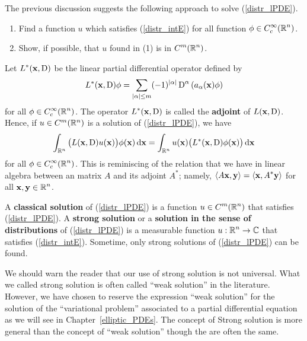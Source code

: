 The previous discussion suggests the following approach to solve
(\ref{distr_lPDE}).
\begin{enumerate}
\item Find a function $u$ which satisfies (\ref{distr_intE}) for all
function $\displaystyle \phi \in C_c^\infty(\mathbb{R}^n)$.
\item Show, if possible, that $u$ found in (1) is in
$\displaystyle C^m(\mathbb{R}^n)$.
\end{enumerate}

Let $\displaystyle L^\ast(\mathbf{x}, \operatorname{D})$ be the linear partial
differential operator defined by
\[
L^\ast(\mathbf{x}, \operatorname{D})\phi = \sum_{|\alpha|\leq m} (-1)^{|\alpha|}
\operatorname{D}^\alpha \left( a_\alpha(\mathbf{x}) \phi \right)
\]
for all $\displaystyle \phi \in C_c^\infty(\mathbb{R}^n)$.  The
operator $\displaystyle L^\ast(\mathbf{x}, \operatorname{D})$ is called the
{\bfseries adjoint} of
$L(\mathbf{x}, \operatorname{D})$.  Hence, if $u \in C^m(\mathbb{R}^n)$ is a solution of
(\ref{distr_lPDE}), we have
\[
\int_{\mathbb{R}^n} \big( L(\mathbf{x}, \operatorname{D})u(\mathbf{x}) \big) \phi(\mathbf{x}) \,\mathrm{d}{\mathbf{x}}
= \int_{\mathbb{R}^n} u(\mathbf{x}) \big( L^\ast(\mathbf{x}, \operatorname{D})\phi(\mathbf{x})
\big) \,\mathrm{d}{\mathbf{x}}
\]
for all $\displaystyle \phi \in C_c^\infty(\mathbb{R}^n)$.
This is reminiscing of the relation that we have in linear algebra between an
\nn matrix $A$ and its adjoint $\displaystyle A^\ast$; namely,
$\displaystyle \left\langle{A\mathbf{x}} , {\mathbf{y}}\right\rangle = \left\langle{\mathbf{x}} , {A^\ast\mathbf{y}}\right\rangle$
for all $\displaystyle \mathbf{x}, \mathbf{y} \in \mathbb{R}^n$.

A {\bfseries classical solution}
of (\ref{distr_lPDE}) is a function
$\displaystyle u\in C^m(\mathbb{R}^n)$ that satisfies (\ref{distr_lPDE}).
A {\bfseries strong solution} or a
{\bfseries solution in the sense of distributions} of (\ref{distr_lPDE}) is a measurable
function $\displaystyle u:\mathbb{R}^n \to \mathbb{C}$ that satisfies (\ref{distr_intE}).
Sometime, only strong solutions of (\ref{distr_lPDE}) can be found.

We should warn the reader that our use of strong solution is not
universal.  What we called strong solution is often called
``weak solution'' in the literature.   However, we have chosen to
reserve the expression ``weak solution'' for the solution of the
``variational problem'' associated to a partial differential equation
as we will see in Chapter~\ref{elliptic_PDEs}.  The concept of
Strong solution is more general than the concept of ``weak solution''
though the are often the same.

